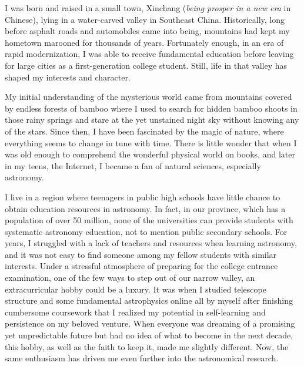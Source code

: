 \documentclass[11pt, a4paper]{awesome-cv} %
\begin{document}
\makecvheader %



\begin{cvletter}

I was born and raised in a small town, Xinchang (\textit{being prosper in a new era} in Chinese), lying in a water-carved valley in Southeast China. Historically, long before asphalt roads and automobiles came into being, mountains had kept my hometown marooned for thousands of years. Fortunately enough, in an era of rapid modernization, I was able to receive fundamental education before leaving for large cities as a first-generation college student. Still, life in that valley has shaped my interests and character.


My initial understanding of the mysterious world came from mountains covered by endless forests of bamboo where I used to search for hidden bamboo shoots in those rainy springs and stare at the yet unstained night sky without knowing any of the stars. Since then, I have been fascinated by the magic of nature, where everything seems to change in tune with time. There is little wonder that when I was old enough to comprehend the wonderful physical world on books, and later in my teens, the Internet, I became a fan of natural sciences, especially astronomy. 

I live in a region where teenagers in public high schools have little chance to obtain education resources in astronomy. In fact, in our province, which has a population of over 50 million, none of the universities can provide students with systematic astronomy education, not to mention public secondary schools. For years, I struggled with a lack of teachers and resources when learning astronomy, and it was not easy to find someone among my fellow students with similar interests. Under a stressful atmosphere of preparing for the college entrance examination, one of the few ways to step out of our narrow valley, an extracurricular hobby could be a luxury. It was when I studied telescope structure and some fundamental astrophysics online all by myself after finishing cumbersome coursework that I realized my potential in self-learning and persistence on my beloved venture. When everyone was dreaming of a promising yet unpredictable future but had no idea of what to become in the next decade, this hobby, as well as the faith to keep it, made me slightly different. Now, the same enthusiasm has driven me even further into the astronomical research.


\end{cvletter}
\end{document}

